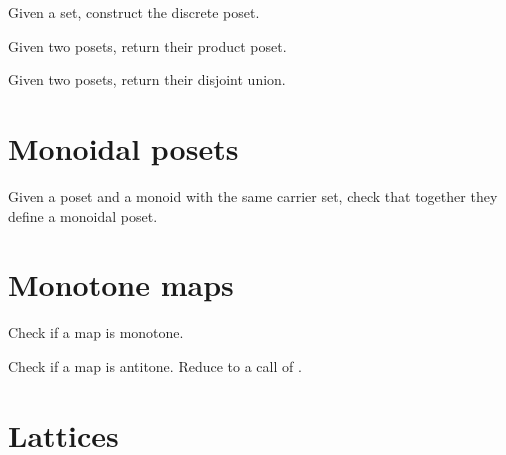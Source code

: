 \begin{gradedexercise}
  Given a set, construct the discrete poset.

\end{gradedexercise}


\begin{gradedexercise}
  Given two posets, return their product poset.
\end{gradedexercise}
\begin{gradedexercise}
  Given two posets, return their disjoint union.

\end{gradedexercise}


\section{Monoidal posets}



\begin{gradedexercise}
  Given a poset and a monoid with the same carrier set, check that together they define a monoidal poset.

\end{gradedexercise}


\section{Monotone maps}




\begin{gradedexercise}
  Check if a map is monotone.

\end{gradedexercise}


\begin{gradedexercise}
  Check if a map is antitone. Reduce to a call of .

\end{gradedexercise}


\section{Lattices}


